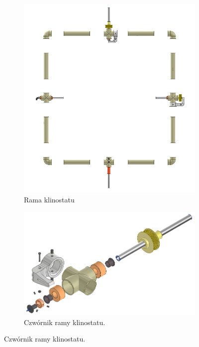 \begin{figure}
	\centering
	
	\begin{subfigure}[b]{.49\textwidth}
		\centering
		\includegraphics[width=\textwidth]{rama_40_aisass}
		\caption{Rama klinostatu} 
		\label{fig:rama_klinostatu}
	\end{subfigure}
	\hfill%
	\begin{subfigure}[b]{.49\textwidth}
		\centering
		\includegraphics[width=\textwidth]{2_diss}
		\caption{Czwórnik ramy klinostatu.} 
		

\end{subfigure}
\end{figure}
